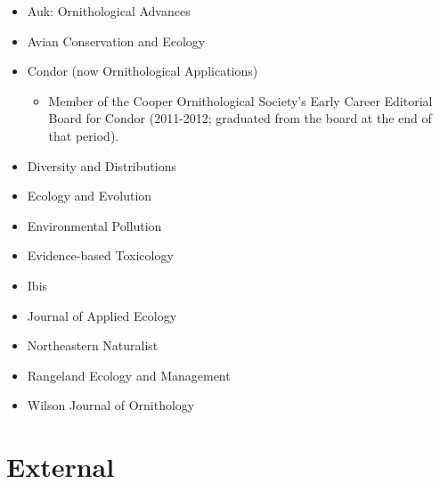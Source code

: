 \documentclass[
  letterpaper,
  DIV=11,
  numbers=noendperiod,
  oneside]{scrreprt}
\providecommand{\tightlist}{%
  \setlength{\itemsep}{0pt}\setlength{\parskip}{0pt}}\usepackage{longtable,booktabs,array}
\begin{document}
\begin{itemize}
\tightlist
\item
  Auk: Ornithological Advances
\item
  Avian Conservation and Ecology
\item
  Condor (now Ornithological Applications)

  \begin{itemize}
  \tightlist
  \item
    Member of the Cooper Ornithological Society's Early Career Editorial
    Board for Condor (2011-2012; graduated from the board at the end of
    that period).
  \end{itemize}
\item
  Diversity and Distributions
\item
  Ecology and Evolution
\item
  Environmental Pollution
\item
  Evidence-based Toxicology
\item
  Ibis
\item
  Journal of Applied Ecology
\item
  Northeastern Naturalist
\item
  Rangeland Ecology and Management
\item
  Wilson Journal of Ornithology
\end{itemize}

\section{External}\label{external}
\end{document}
